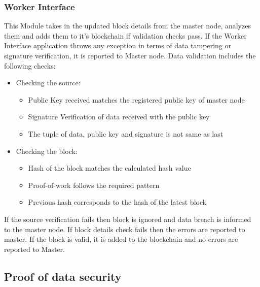 \documentclass[10pt,journal,compsoc]{IEEEtran}
\begin{document}
\subsubsection{Worker Interface}
This Module takes in the updated block details from the master node, analyzes them and adds them to it's blockchain if validation checks pass. If the Worker Interface application throws any exception in terms of data tampering or signature verification, it is reported to Master node. Data validation includes the following checks:
\begin{itemize}
\item Checking the source:
\begin{itemize}
\item Public Key received matches the registered public key of master node
\item Signature Verification of data received with the public key
\item The tuple of data, public key and signature is not same as last
\end{itemize}
\item Checking the block:\
\begin{itemize}
\item Hash of the block matches the calculated hash value
\item Proof-of-work follows the required pattern
\item Previous hash corresponds to the hash of the latest block
\end{itemize}
\end{itemize}
If the source verification fails then block is ignored and data breach is informed to the master node. If block details check fails then the errors are reported to master. If the block is valid, it is added to the blockchain and no errors are reported to Master.

\subsection*{Proof of data security}
\end{document}
